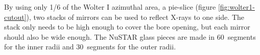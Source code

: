 
By using only 1/6 of the Wolter I azimuthal area, a pie-slice (figure \ref{fig:wolter1-cutout}), two stacks of mirrors can be used to reflect X-rays to one side. The stack only needs to be high enough to cover the bore opening, but each mirror should also be wide enough. The NuSTAR glass pieces are made in 60\degr\ segments for the inner radii and 30\degr\ segments for the outer radii.

